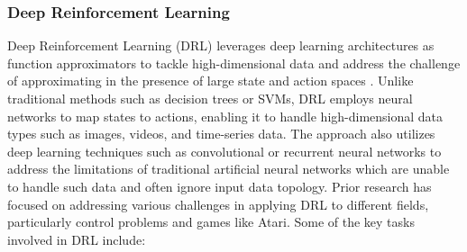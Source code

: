 \documentclass[12pt,oneside]{article}
\begin{document}
\subsubsection{Deep Reinforcement Learning}
Deep Reinforcement Learning (DRL) leverages deep learning architectures as function approximators to tackle high-dimensional data and address the challenge of approximating in the presence of large state and action spaces \cite{32_boute2022deep}. Unlike traditional methods such as decision trees or SVMs, DRL employs neural networks to map states to actions, enabling it to handle high-dimensional data types such as images, videos, and time-series data. The approach also utilizes deep learning techniques such as convolutional or recurrent neural networks to address the limitations of traditional artificial neural networks which are unable to handle such data and often ignore input data topology. Prior research has focused on addressing various challenges in applying DRL to different fields, particularly control problems and games like Atari. Some of the key tasks involved in DRL include:
\end{document}
